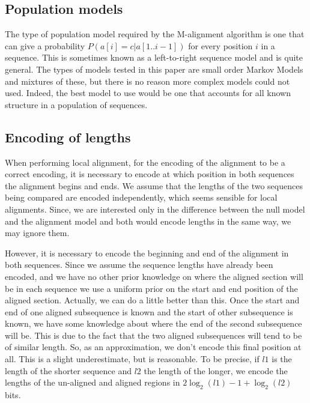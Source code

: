 \documentclass[a4paper,11pt,oneside]{article}
\begin{document}
\subsection{Population models}

The type of population model required by the M-alignment algorithm is one that
can give a probability $P(a[i]=c|a[1..i-1])$ for every position $i$ in a
sequence.  This is sometimes known as a left-to-right sequence model and is
quite general.  The types of models tested in this paper are small order
Markov Models and mixtures of these, but there is no reason more complex models
could not used.  Indeed, the best model to use would be one that accounts for
all known structure in a population of sequences.


\subsection{Encoding of lengths}

When performing local alignment, for the encoding of the alignment to be a
correct encoding, it is necessary to encode at which position in both
sequences the alignment begins and ends.  We assume that the lengths of the
two sequences being compared are encoded independently, which seems sensible
for local alignments.  Since, we are interested only in the difference between
the null model and the alignment model and both would encode lengths in the
same way, we may ignore them.

However, it is necessary to encode the beginning and end of the alignment in
both sequences.  Since we assume the sequence lengths have already been
encoded, and we have no other prior knowledge on where the aligned section
will be in each sequence we use a uniform prior on the start and end position
of the aligned section.  Actually, we can do a little better than this.  Once
the start and end of one aligned subsequence is known and the start of other
subsequence is known, we have some knowledge about where the end of the second
subsequence will be.  This is due to the fact that the two aligned
subsequences will tend to be of similar length.  So, as an approximation, we
don't encode this final position at all.  This is a slight underestimate, but
is reasonable.  To be precise, if $l1$ is the length of the shorter sequence
and $l2$ the length of the longer, we encode the lengths of the un-aligned and
aligned regions in $2\log_2(l1) - 1 + \log_2(l2)$ bits.
\end{document}
